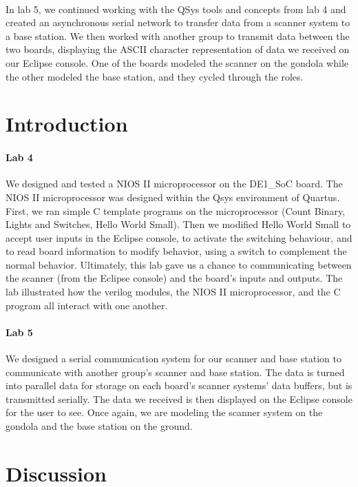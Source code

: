 \documentclass{article}
\begin{document}
\paragraph{} In lab 5, we continued working with the QSys tools and concepts from lab 4 and created an asynchronous serial network to transfer data from a scanner system to a base station. We then worked with another group to transmit data between the two boards, displaying the ASCII character representation of data we received on our Eclipse console. One of the boards modeled the scanner on the gondola while the other modeled the base station, and they cycled through the roles.


\section{Introduction}
\paragraph{Lab 4} We designed and tested a NIOS II microprocessor on the DE1\_SoC board. The NIOS II microprocessor was designed within the Qsys environment of Quartus. First, we ran simple C template programs on the microprocessor (Count Binary, Lights and Switches, Hello World Small). Then we modified Hello World Small to accept user inputs in the Eclipse console, to activate the switching behaviour, and to read board information to modify behavior, using a switch to complement the normal behavior. Ultimately, this lab gave us a chance to communicating between the scanner (from the Eclipse console) and the board's inputs and outputs. The lab illustrated how the verilog modules, the NIOS II microprocessor, and the C program all interact with one another.

\paragraph{Lab 5} We designed a serial communication system for our scanner and base station to communicate with another group’s scanner and base station. The data is turned into parallel data for storage on each board's scanner systems' data buffers, but is transmitted serially. The data we received is then displayed on the Eclipse console for the user to see. Once again, we are modeling the scanner system on the gondola and the base station on the ground.


\section{Discussion}
\end{document}
